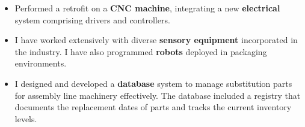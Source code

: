 \documentclass[10pt,a4paper]{altacv}
\begin{document}

\begin{fullwidth}
\makecvheader
\end{fullwidth}




\begin{itemize}
\item Performed a retrofit on a \textbf{CNC machine}, integrating a new \textbf{electrical} system comprising drivers and controllers.
\item  I have worked extensively with diverse \textbf{sensory equipment} incorporated in the industry. I have also programmed \textbf{robots} deployed in packaging environments.
\end{itemize}
\medskip


\begin{itemize}
\item I designed and developed a \textbf{database} system to manage substitution parts for assembly line machinery effectively. The database included a registry that documents the replacement dates of parts and tracks the current inventory levels.
\end{itemize}
\end{document}
